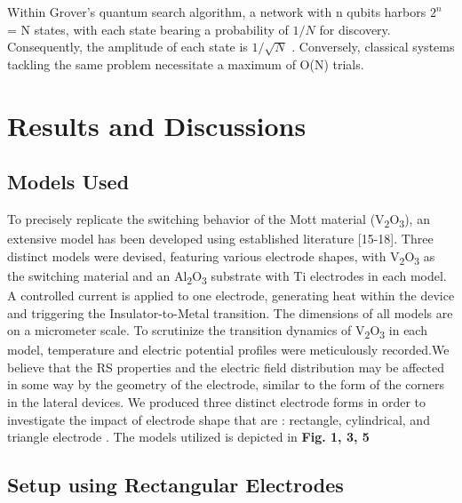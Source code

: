 \documentclass[conference]{IEEEtran}
\begin{document}
Within Grover’s quantum search algorithm, a network with
n qubits harbors $ 2^{n} $ = N states, with each state bearing a
probability of $ 1/N $ for discovery. Consequently, the amplitude
of each state is $ 1/\sqrt{N} $
. Conversely, classical systems tackling the
same problem necessitate a maximum of O(N) trials.
\section{Results and Discussions}
\subsection{ Models Used}\label{AA}

To precisely replicate the switching behavior of the Mott material (V\textsubscript{2}O\textsubscript{3}), an extensive model has been developed using established literature [15-18]. Three distinct models were devised, featuring various electrode shapes, with V\textsubscript{2}O\textsubscript{3} as the switching material and an Al\textsubscript{2}O\textsubscript{3} substrate with Ti electrodes in each model. A controlled current is applied to one electrode, generating heat within the device and triggering the Insulator-to-Metal transition. The dimensions of all models are on a micrometer scale. To scrutinize the transition dynamics of V\textsubscript{2}O\textsubscript{3} in each model, temperature and electric potential profiles were meticulously recorded.We believe that the RS properties and the electric field distribution may be affected in some way by the geometry of the electrode, similar to the form of the corners in the lateral devices. We produced three distinct electrode forms in order to investigate the impact of electrode shape that are
: rectangle, cylindrical, and triangle electrode . The models utilized is depicted in \textbf{Fig. 1, 3, 5}



\subsection{Setup using Rectangular Electrodes}
\end{document}
